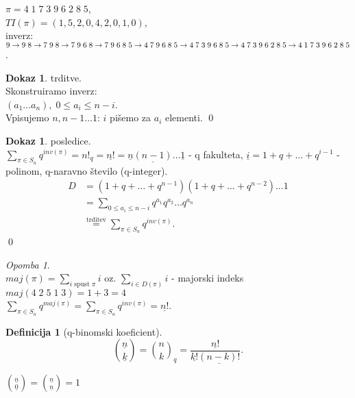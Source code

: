\documentclass[a4paper, 12pt]{book}
\theoremstyle{definition}
\newtheorem{defn}[counter]{Definicija}
\newtheorem{pro}[counter]{Dokaz}
\theoremstyle{remark}
\newtheorem*{rem}{Opomba}
\begin{document}
$\pi = 4 \; 1 \; 7 \; 3 \; 9 \; 6 \; 2 \; 8 \; 5$, \\
$TI(\pi) = (1, 5, 2, 0, 4, 2, 0, 1, 0)$, \\
inverz: $9 \to 9 \; 8 \to 7 \; 9 \; 8 \to 7 \; 9 \; 6 \; 8 \to 7 \; 9 \; 6 \; 8 \; 5 \to 4 \; 7 \; 9 \; 6 \; 8 \; 5 \\
\to 4 \; 7 \; 3 \; 9 \; 6 \; 8 \; 5 \to 4 \; 7 \; 3 \; 9 \; 6 \; 2 \; 8 \; 5 \to 4 \;  1 \; 7 \; 3 \; 9 \; 6 \; 2 \; 8 \; 5$.
\begin{pro} trditve. \\
  Skonstruiramo inverz: \\
  $(a_1 \dots a_n), \; 0 \leq a_i \leq n-i$. \\
  Vpisujemo $n, n-1 \dots 1$: $i$ pišemo za $a_i$ elementi.
  \qed
\end{pro}
\begin{pro} posledice. \\
  $\sum_{\pi \in S_n} q^{inv(\pi)} = n!_q = \underline{n!} = \underline{n} \underline{(n-1)} \dots \underline{1}$ -
  q fakulteta,
  $\underline{i} = 1 + q + \dots + q^{i-1}$ - polinom, q-naravno število (q-integer). \\
  \begin{align*}
    D &= (1 + q + \dots + q^{n-1}) (1 + q + \dots + q^{n-2}) \dots 1 \\
    &= \sum_{0 \leq a_i \leq n-i} q^{a_1} q^{a_2} \dots q^{a_n} \\
    &\stackrel{\text{trditev}}{=} \sum_{\pi \in S_n} q^{inv(\pi)}.
  \end{align*}
  \qed
\end{pro}
\begin{rem} \text{} \\
  $maj(\pi) = \sum_{i \text{ spust } \pi} i$ oz. $\sum_{i \in D(\pi)} i$ - majorski indeks \\
  $maj(4 \; 2 \; 5 \; 1 \; 3) = 1 + 3 = 4$ \\
  $\sum_{\pi \in S_n} q^{maj(\pi)} = \sum_{\pi \in S_n} q^{inv(\pi)} = \underline{n!}$.
\end{rem}
\begin{defn}[q-binomski koeficient]
  \begin{equation*}
    \binom{\underline{n}}{\underline{k}} = \binom{n}{k}_q = \frac{\underline{n!}}{\underline{k!} \underline{(n-k)!}}.
  \end{equation*}
\end{defn}
$\binom{\underline{n}}{\underline{0}} = \binom{\underline{n}}{\underline{n}} = 1$ \\
\end{document}

